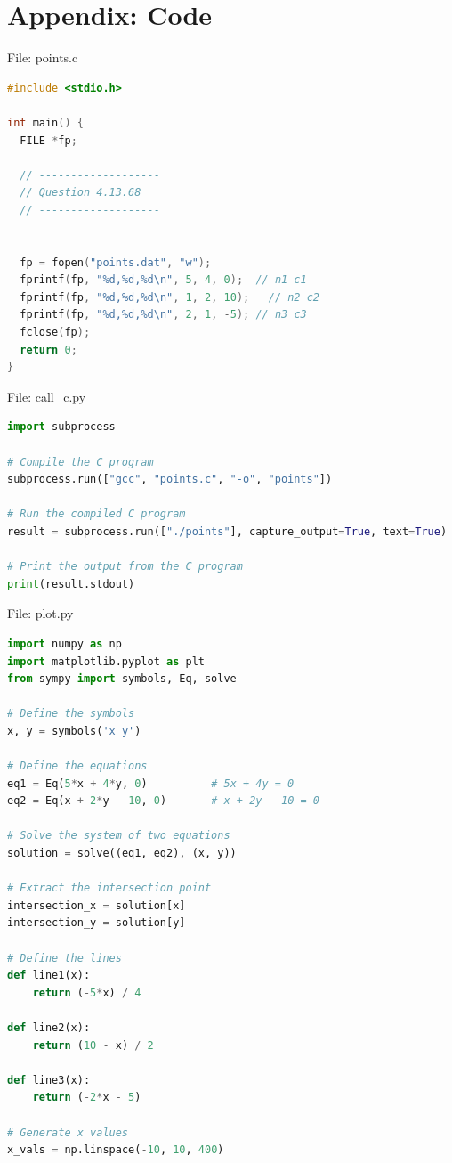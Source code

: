 \documentclass{beamer}
\numberwithin{equation}{section}
\theoremstyle{remark}
\begin{document}
\section*{Appendix: Code}

\begin{frame}[fragile]{File: points.c}
\begin{lstlisting}[language=C]
#include <stdio.h>

int main() {
  FILE *fp;

  // -------------------
  // Question 4.13.68
  // -------------------


  fp = fopen("points.dat", "w");
  fprintf(fp, "%d,%d,%d\n", 5, 4, 0);  // n1 c1
  fprintf(fp, "%d,%d,%d\n", 1, 2, 10);   // n2 c2
  fprintf(fp, "%d,%d,%d\n", 2, 1, -5); // n3 c3
  fclose(fp);
  return 0;
}
\end{lstlisting}
\end{frame}

\begin{frame}[fragile]{File: call\_c.py}
\begin{lstlisting}[language=Python]
import subprocess

# Compile the C program
subprocess.run(["gcc", "points.c", "-o", "points"])

# Run the compiled C program
result = subprocess.run(["./points"], capture_output=True, text=True)

# Print the output from the C program
print(result.stdout)
\end{lstlisting}
\end{frame}

\begin{frame}[fragile]{File: plot.py}
\begin{lstlisting}[language=Python]
import numpy as np
import matplotlib.pyplot as plt
from sympy import symbols, Eq, solve

# Define the symbols
x, y = symbols('x y')

# Define the equations
eq1 = Eq(5*x + 4*y, 0)          # 5x + 4y = 0
eq2 = Eq(x + 2*y - 10, 0)       # x + 2y - 10 = 0

# Solve the system of two equations
solution = solve((eq1, eq2), (x, y))

# Extract the intersection point
intersection_x = solution[x]
intersection_y = solution[y]

# Define the lines
def line1(x):
    return (-5*x) / 4

def line2(x):
    return (10 - x) / 2

def line3(x):
    return (-2*x - 5)

# Generate x values
x_vals = np.linspace(-10, 10, 400)
\end{lstlisting}
\end{frame}
\end{document}
